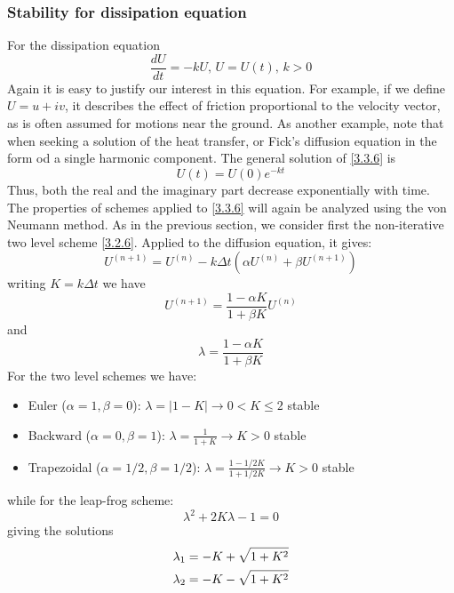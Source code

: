 \subsubsection{Stability for dissipation equation}
For the dissipation equation
\begin{equation}\label{3.3.6}
	\frac{dU}{dt}=-kU \text{,} \,\, U=U(t)\text{,} \,\, k>0
\end{equation}
Again it is easy to justify our interest in this equation. For example, if we define $U=u+iv$, it describes the effect of friction proportional to the velocity vector, as is often assumed for motions near the ground. As another example, note that when seeking a solution of the heat transfer, or Fick’s diffusion equation in the form od a single harmonic component.
The general solution of \ref{3.3.6} is
\begin{equation}
	U(t)=U(0)e^{-kt}
\end{equation}
Thus, both the real and the imaginary part decrease exponentially with time.
The properties of schemes applied to \ref{3.3.6} will again be analyzed using the von Neumann method. As in the previous section, we consider first the non-iterative two level scheme \ref{3.2.6}. Applied to the diffusion equation, it gives:
\begin{equation}\label{3.3.8}
	U^{(n+1)}=U^{(n)}-k\Delta t\left(\alpha U^{(n)}+\beta U^{(n+1)}\right)
\end{equation}
writing $K=k\Delta t$ we have
\begin{equation}\label{3.3.10}
	U^{(n+1)}=\frac{1-\alpha K}{1+\beta K}U^{(n)}
\end{equation}
and
\begin{equation}
	\lambda=\frac{1-\alpha K}{1+\beta K}
\end{equation}
For the two level schemes we have:
\begin{itemize}
	\item Euler ($\alpha=1, \beta=0$): $\lambda=|1-K|\rightarrow0<K\leq2$ stable
	\item Backward ($\alpha=0, \beta=1$): $\lambda=\frac{1}{1+K}\rightarrow K>0$ stable
	\item Trapezoidal ($\alpha=1/2, \beta=1/2$): $\lambda=\frac{1-1/2K}{1+1/2K}\rightarrow K>0$ stable
\end{itemize}
while for the leap-frog scheme:
$$\lambda^2+2K\lambda-1=0$$
giving the solutions
\begin{align}
	\lambda_1=-K+\sqrt{1+K^2} \\
	\lambda_2=-K-\sqrt{1+K^2}\notag
\end{align}
